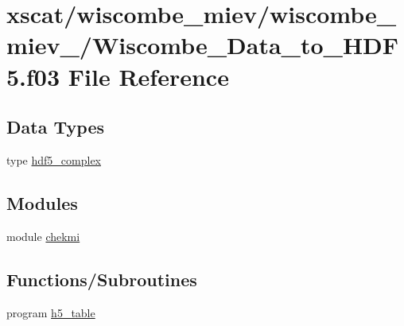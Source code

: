 \hypertarget{_wiscombe___data__to___h_d_f5_8f03}{}\section{xscat/wiscombe\+\_\+miev/wiscombe\+\_\+miev\+\_/\+Wiscombe\+\_\+\+Data\+\_\+to\+\_\+\+H\+D\+F5.f03 File Reference}
\label{_wiscombe___data__to___h_d_f5_8f03}
\subsection*{Data Types}
\begin{DoxyCompactItemize}
\item 
type \hyperlink{structhdf5__complex}{hdf5\+\_\+complex}
\end{DoxyCompactItemize}
\subsection*{Modules}
\begin{DoxyCompactItemize}
\item 
module \hyperlink{namespacechekmi}{chekmi}
\end{DoxyCompactItemize}
\subsection*{Functions/\+Subroutines}
\begin{DoxyCompactItemize}
\item 
program \hyperlink{_wiscombe___data__to___h_d_f5_8f03_a77b66a0fea3a45a6d2ef602b230528c4}{h5\+\_\+table}
\end{DoxyCompactItemize}
